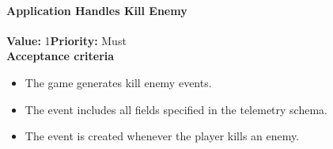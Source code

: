 \paragraph{Application Handles Kill Enemy}
\textbf{Value:} 1\quad \textbf{Priority:} Must\\
\textbf{Acceptance criteria}
\begin{itemize}
  \item The game generates kill enemy events.
  \item The event includes all fields specified in the telemetry schema.
  \item The event is created whenever the player kills an enemy.
\end{itemize}
